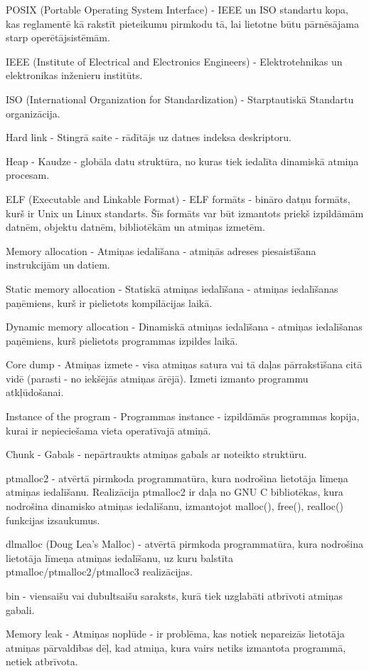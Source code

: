 \noindent 

POSIX (Portable Operating System Interface) - IEEE un ISO standartu kopa,  kas reglamentē kā rakstīt pieteikumu pirmkodu tā, lai lietotne būtu pārnēsājama starp operētājsistēmām.

IEEE (Institute of Electrical and Electronics Engineers) - Elektrotehnikas un elektronikas inženieru institūts.

ISO (International Organization for Standardization) - Starptautiskā Standartu organizācija.

Hard link - Stingrā saite - rādītājs uz datnes indeksa deskriptoru. 

Heap - Kaudze - globāla datu struktūra,  no kuras tiek iedalīta dinamiskā atmiņa procesam.

ELF (Executable and Linkable Format) - ELF formāts -  bināro datņu formāts, kurš ir Unix un Linux standarts. Šīs formāts var būt izmantots priekš izpildāmām datnēm, objektu datnēm, bibliotēkām un atmiņas izmetēm.

Memory allocation - Atmiņas iedalīšana - atmiņās adreses piesaistīšana instrukcijām un datiem.

Static memory allocation - Statiskā atmiņas iedalīšana -  atmiņas iedalīšanas paņēmiens, kurš ir pielietots kompilācijas laikā.

Dynamic memory allocation - Dinamiskā atmiņas iedalīšana - atmiņas iedalīšanas paņēmiens, kurš pielietots programmas izpildes laikā. 

Core dump - Atmiņas izmete - visa atmiņas satura vai tā daļas pārrakstīšana citā vidē (parasti - no iekšējās atmiņas ārējā). 
Izmeti izmanto programmu atkļūdošanai.

Instance of the program - Programmas instance - izpildāmās programmas kopija, kurai ir nepieciešama vieta operatīvajā atmiņā.

Chunk - Gabals - nepārtraukts atmiņas gabals ar noteikto struktūru.

ptmalloc2 - atvērtā pirmkoda programmatūra, kura nodrošina lietotāja līmeņa atmiņas iedalīšanu. Realizācija ptmalloc2 ir daļa no GNU C bibliotēkas, kura nodrošina dinamisko atmiņas iedalīšanu, izmantojot malloc(), free(), realloc() funkcijas izsaukumus.

dlmalloc (Doug Lea's Malloc) - atvērtā pirmkoda programmatūra, kura nodrošina lietotāja līmeņa atmiņas iedalīšanu, uz kuru balstīta ptmalloc/ptmalloc2/ptmalloc3 realizācijas.

bin - viensaišu vai dubultsaišu saraksts, kurā tiek uzglabāti atbrīvoti atmiņas gabali.

Memory leak - Atmiņas noplūde - ir problēma, kas notiek nepareizās lietotāja atmiņas pārvaldības dēļ, kad atmiņa, kura vairs netiks izmantota programmā, netiek atbrīvota.

